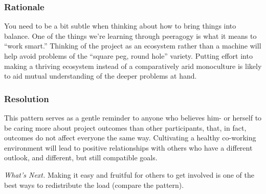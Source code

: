 \subsubsection*{Rationale} You need to be a bit subtle when thinking about how to bring
things into balance.  One of the things we're learning through
peeragogy is what it means to ``work smart.''  Thinking of the project as an ecosystem rather than a
machine will help avoid problems of the ``square peg, round hole''
variety.  Putting effort into making a thriving ecosystem instead of
a comparatively arid monoculture is likely to aid mutual understanding of
the deeper problems at hand.

\subsubsection*{Resolution}
This pattern serves as a gentle reminder to anyone who believes him- or
herself to be caring more about project outcomes than other
participants, that, in fact, outcomes do not affect everyone the same way.
Cultivating a healthy co-working environment will lead to positive relationships
with others who have a different outlook, and different, but still compatible goals.

\begin{framed}
\emph{What's Next.}
Making it easy
and fruitful for others to get involved is one of the best ways to
redistribute the load (compare the
pattern).
\end{framed}
\endgroup

    
    
    

    
    
    
    
    
    
    
    
    
    
    
    
    
    